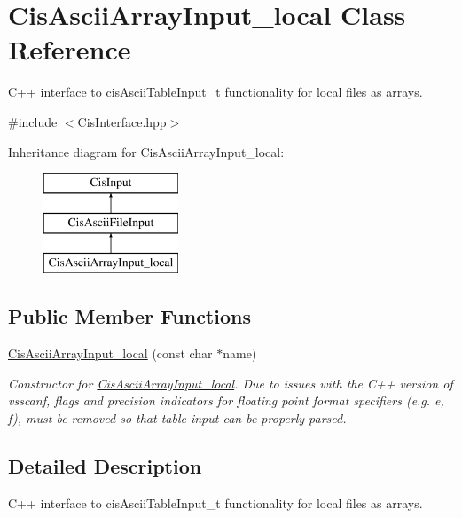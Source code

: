 \hypertarget{classCisAsciiArrayInput__local}{}\section{Cis\+Ascii\+Array\+Input\+\_\+local Class Reference}
\label{classCisAsciiArrayInput__local}


C++ interface to cis\+Ascii\+Table\+Input\+\_\+t functionality for local files as arrays.  




{\ttfamily \#include $<$Cis\+Interface.\+hpp$>$}

Inheritance diagram for Cis\+Ascii\+Array\+Input\+\_\+local\+:\begin{figure}[H]
\begin{center}
\leavevmode
\includegraphics[height=3.000000cm]{classCisAsciiArrayInput__local}
\end{center}
\end{figure}
\subsection*{Public Member Functions}
\begin{DoxyCompactItemize}
\item 
\mbox{\hyperlink{classCisAsciiArrayInput__local_ab1a315749639f0edd562184bcdb34d42}{Cis\+Ascii\+Array\+Input\+\_\+local}} (const char $\ast$name)
\begin{DoxyCompactList}\small\item\em Constructor for \mbox{\hyperlink{classCisAsciiArrayInput__local}{Cis\+Ascii\+Array\+Input\+\_\+local}}. Due to issues with the C++ version of vsscanf, flags and precision indicators for floating point format specifiers (e.\+g. e, f), must be removed so that table input can be properly parsed. \end{DoxyCompactList}\end{DoxyCompactItemize}


\subsection{Detailed Description}
C++ interface to cis\+Ascii\+Table\+Input\+\_\+t functionality for local files as arrays. 

